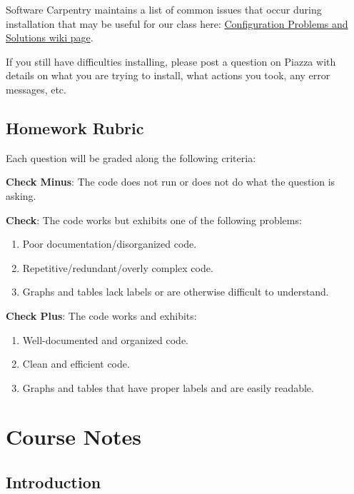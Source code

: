 \documentclass[
]{book}
\providecommand{\tightlist}{%
  \setlength{\itemsep}{0pt}\setlength{\parskip}{0pt}}
\begin{document}
Software Carpentry maintains a list of common issues that occur during installation that may be useful for our class here: \href{https://github.com/swcarpentry/workshop-template/wiki/Configuration-Problems-and-Solutions}{Configuration Problems and Solutions wiki page}.

If you still have difficulties installing, please post a question on Piazza with details on what you are trying to install, what actions you took, any error messages, etc.

\hypertarget{homework-rubric}{%
\chapter{Homework Rubric}\label{homework-rubric}}

Each question will be graded along the following criteria:

\textbf{Check Minus}: The code does not run or does not do what the question is asking.

\textbf{Check}: The code works but exhibits one of the following problems:

\begin{enumerate}
\def\labelenumi{\arabic{enumi})}
\tightlist
\item
  Poor documentation/disorganized code.
\item
  Repetitive/redundant/overly complex code.
\item
  Graphs and tables lack labels or are otherwise difficult to understand.
\end{enumerate}

\textbf{Check Plus}: The code works and exhibits:

\begin{enumerate}
\def\labelenumi{\arabic{enumi})}
\tightlist
\item
  Well-documented and organized code.
\item
  Clean and efficient code.
\item
  Graphs and tables that have proper labels and are easily readable.
\end{enumerate}

\hypertarget{part-course-notes}{%
\part{Course Notes}\label{part-course-notes}}

\hypertarget{introduction}{%
\chapter{Introduction}\label{introduction}}
\end{document}
